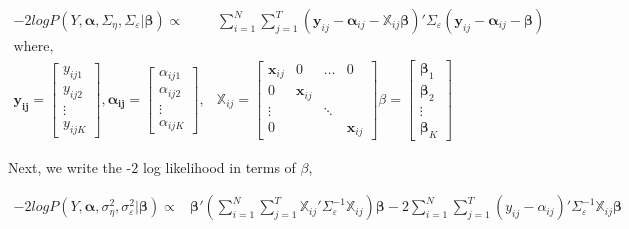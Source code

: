 \documentclass[
]{article}
\begin{document}
\begin{equation*}
\begin{aligned}
-2logP(Y, \boldsymbol{\alpha}, \Sigma_\eta, \Sigma_\varepsilon|\boldsymbol{\beta}) \propto & \sum^N_{i=1}\sum^T_{j=1} (\boldsymbol{y}_{ij} - \boldsymbol{\alpha}_{ij} - \boldsymbol{ \mathbb{X}}_{ij}\boldsymbol{\beta})' \Sigma_\varepsilon(\boldsymbol{y}_{ij} - \boldsymbol{\alpha}_{ij} - \boldsymbol{\beta})\\
\text{where,}\\
\boldsymbol{y_{ij}} = \begin{bmatrix}y_{ij1}\\y_{ij2}\\ \vdots \\ y_{ijK}\end{bmatrix}, 
\boldsymbol{\alpha_{ij}} = \begin{bmatrix}\alpha_{ij1}\\\alpha_{ij2}\\ \vdots \\ \alpha_{ijK}\end{bmatrix},  &
\boldsymbol{ \mathbb{X}}_{ij} = \begin{bmatrix}\boldsymbol{x}_{ij} & 0 & \dots & 0 \\ 0 & \boldsymbol{x}_{ij} \\ \vdots & & \ddots \\
0 & & & \boldsymbol{x}_{ij}\end{bmatrix} 
\beta = \begin{bmatrix}\boldsymbol{\beta}_1\\ \boldsymbol{\beta}_2 \\ \vdots \\ \boldsymbol{\beta}_K\end{bmatrix}
\end{aligned}
\end{equation*}

Next, we write the -2 log likelihood in terms of \(\beta\),

\begin{equation*}
\begin{aligned}
-2logP(Y, \boldsymbol{\alpha}, \sigma^2_\eta, \sigma^2_\varepsilon|\boldsymbol{\beta}) 
\propto & \boldsymbol{\beta}'(\sum^N_{i=1}\sum^T_{j=1}\boldsymbol{ \mathbb{X}}_{ij}'\Sigma_\varepsilon^{-1}\boldsymbol{ \mathbb{X}}_{ij})\boldsymbol{\beta} -2\sum^N_{i=1}\sum^T_{j=1}(y_{ij} - \alpha_{ij})'\Sigma_\varepsilon^{-1}\boldsymbol{ \mathbb{X}}_{ij}\boldsymbol{\beta} 
\end{aligned}
\end{equation*}
\end{document}
